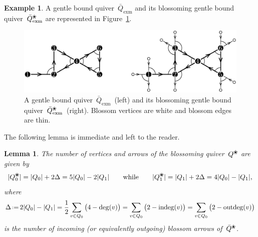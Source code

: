 \documentclass{amsart}
\newtheorem{lemma}[theorem]{Lemma}
\theoremstyle{definition}
\newtheorem{example}[theorem]{Example}
\newcommand{\eqdef}{\mbox{\,\raisebox{0.2ex}{\scriptsize\ensuremath{\mathrm:}}\ensuremath{=}\,}} %
\newcommand{\fref}[1]{Figure~\ref{#1}} %
\newcommand{\ex}{_{\textrm{exm}}} %
\newcommand{\blossom}{^\text{\ding{96}}} %
\newcommand{\indeg}{\mathrm{indeg}} %
\newcommand{\outdeg}{\mathrm{outdeg}} %
\begin{document}
\begin{example}
A gentle bound quiver~$\bar Q\ex$ and its blossoming gentle bound quiver~$\bar Q\ex\blossom$ are represented in \fref{fig:exmBlossomingQuiver}.
\vspace*{-.4cm}

\begin{figure}[h]
	\capstart
	\centerline{\includegraphics[scale=.7]{exmBlossomingQuiver}}
	\caption{A gentle bound quiver~$\bar Q\ex$~(left) and its blossoming gentle bound quiver~$\bar Q\blossom\ex$~(right). Blossom vertices are white and blossom edges are thin.}
	\label{fig:exmBlossomingQuiver}
\end{figure}
\end{example}

The following lemma is immediate and left to the reader.

\begin{lemma}
The number of vertices and arrows of the blossoming quiver~$Q\blossom$ are given by
\[
|Q\blossom_0| = |Q_0| + 2\Delta = 5|Q_0|-2|Q_1|
\qquad\text{while}\qquad
|Q\blossom_1| = |Q_1| + 2\Delta = 4|Q_0|-|Q_1|,
\]
where
\[
\Delta \eqdef 2|Q_0| - |Q_1| = \frac{1}{2} \sum_{v \in Q_0} \big( 4-\deg(v) \big) = \sum_{v \in Q_0} \big( 2-\indeg(v) \big) = \sum_{v \in Q_0} \big( 2-\outdeg(v) \big)
\]
is the number of incoming (or equivalently outgoing) blossom arrows of~$\bar Q\blossom$.
\end{lemma}
\end{document}
